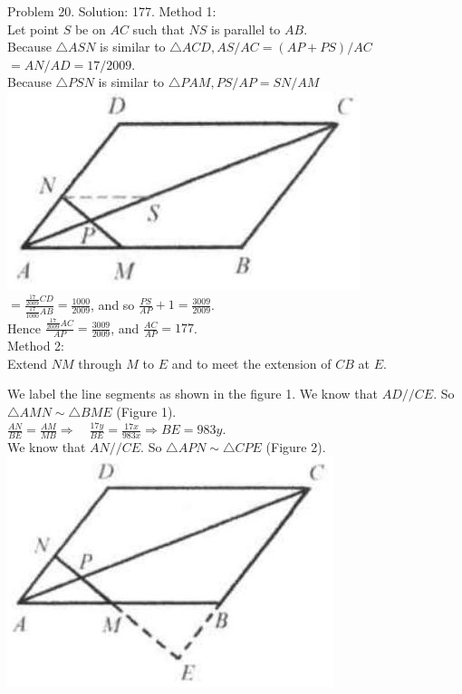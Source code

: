 \documentclass[10pt]{article}
\begin{document}
Problem 20. Solution: 177.
Method 1:\\
Let point \(S\) be on \(A C\) such that \(N S\) is parallel to \(A B\).\\
Because \(\triangle A S N\) is similar to \(\triangle A C D, A S / A C=(A P+P S) / A C\) \(=A N / A D=17 / 2009\).\\
Because \(\triangle P S N\) is similar to \(\triangle P A M, P S / A P=S N / A M\)\\
\includegraphics[max width=\textwidth, center]{2025_04_17_97bc1f7e44d93c271a88g-141(2)}\\
\(=\frac{\frac{17}{2009} C D}{\frac{17}{1000} A B}=\frac{1000}{2009}\), and so \(\frac{P S}{A P}+1=\frac{3009}{2009}\).\\
Hence \(\frac{\frac{17}{2009} A C}{A P}=\frac{3009}{2009}\), and \(\frac{A C}{A P}=177\).\\
Method 2:\\
Extend \(N M\) through \(M\) to \(E\) and to meet the extension of \(C B\) at \(E\).


We label the line segments as shown in the figure 1. We know that \(A D / / C E\). So \(\triangle A M N \sim \triangle B M E\) (Figure 1).\\
\(\frac{A N}{B E}=\frac{A M}{M B} \Rightarrow \quad \frac{17 y}{B E}=\frac{17 x}{983 x} \Rightarrow B E=983 y\).\\
We know that \(A N / / C E\). So \(\triangle A P N \sim \triangle C P E\) (Figure 2).\\
\includegraphics[max width=\textwidth, center]{2025_04_17_97bc1f7e44d93c271a88g-142(2)}
\end{document}
